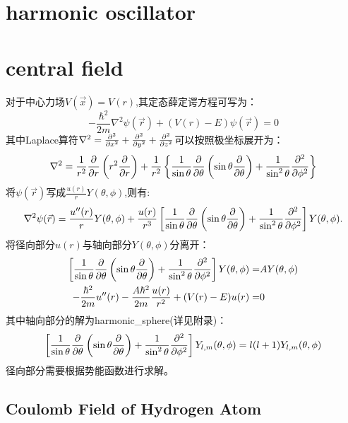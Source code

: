\section{harmonic oscillator}
\section{central field}
对于中心力场$V(\vec{x})=V(r)$,其定态薛定谔方程可写为：
\begin{equation}
    -\frac{\hbar^2}{2m}\nabla^2\psi(\vec{r})+(V(r)-E)\psi(\vec{r})=0
\end{equation}
其中Laplace算符$\nabla^2=\frac{\partial^2 }{\partial x^2}+\frac{\partial^2 }{\partial y^2}+\frac{\partial^2 }{\partial z^2}$可以按照极坐标展开为：
\begin{equation}
    \nabla^2=\frac{1}{r^2}\frac{\partial }{\partial r}\left(r^2\frac{\partial }{\partial r}\right)+\frac{1}{r^2}\left\lbrace \frac{1}{\sin\theta}\frac{\partial }{\partial \theta}\left(\sin\theta\frac{\partial }{\partial \theta}\right)+\frac{1}{\sin^2\theta}\frac{\partial^2 }{\partial \phi^2}\right\rbrace
\end{equation}
将$\psi(\vec{r})$写成$\frac{u(r)}{r}Y(\theta,\phi)$,则有:
\begin{equation}
    \nabla^2\psi(\vec{r})=\frac{u''(r)}{r}Y(\theta,\phi)+\frac{u(r)}{r^3}\left[ \frac{1}{\sin\theta}\frac{\partial }{\partial \theta}\left(\sin\theta\frac{\partial }{\partial \theta}\right)+\frac{1}{\sin^2\theta}\frac{\partial^2 }{\partial \phi^2}\right]Y(\theta,\phi).
\end{equation}
将径向部分$u(r)$与轴向部分$Y(\theta,\phi)$分离开：
\begin{align}
    \left[ \frac{1}{\sin\theta}\frac{\partial }{\partial \theta}\left(\sin\theta\frac{\partial }{\partial \theta}\right)+\frac{1}{\sin^2\theta}\frac{\partial^2 }{\partial \phi^2}\right]Y(\theta,\phi)=&AY(\theta,\phi)\\
    -\frac{\hbar^2}{2m}u''(r)-\frac{A\hbar^2}{2m}\frac{u(r)}{r^2}+(V(r)-E)u(r)=&0
\end{align}
其中轴向部分的解为\gls{harmonic_sphere}(详见附录)：
\begin{equation}
    \left[ \frac{1}{\sin\theta}\frac{\partial }{\partial \theta}\left(\sin\theta\frac{\partial }{\partial \theta}\right)+\frac{1}{\sin^2\theta}\frac{\partial^2 }{\partial \phi^2}\right]Y_{l,m}(\theta,\phi)=l(l+1)Y_{l,m}(\theta,\phi)
\end{equation}
径向部分需要根据势能函数进行求解。

\subsection{Coulomb Field of Hydrogen Atom}

\newpage 
